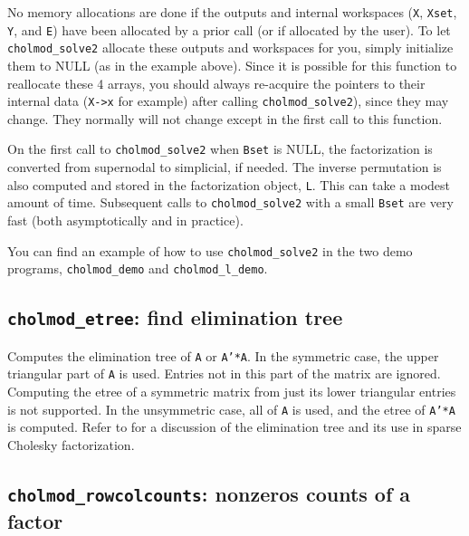 \documentclass[11pt]{article}
\begin{document}
No memory allocations are done if the outputs and internal
workspaces ({\tt X}, {\tt Xset}, {\tt Y}, and {\tt E}) have been allocated
by a prior call (or if allocated by the user).  To let {\tt cholmod\_solve2}
allocate these outputs and workspaces for you, simply initialize them to
NULL (as in the example above).  Since it is possible for this function
to reallocate these 4 arrays, you should always re-acquire the pointers to
their internal data ({\tt X->x} for example) after calling
{\tt cholmod\_solve2}), since they may change.  They normally will not
change except in the first call to this function.

On the first call to {\tt cholmod\_solve2} when {\tt Bset} is NULL,
the factorization is converted from supernodal to simplicial, if needed.
The inverse permutation is also computed and stored in the factorization
object, {\tt L}.  This can take a modest amount of time.  Subsequent
calls to {\tt cholmod\_solve2} with a small {\tt Bset}
are very fast (both asymptotically and in practice).

You can find an example of how to use {\tt cholmod\_solve2} in the
two demo programs, {\tt cholmod\_demo} and {\tt cholmod\_l\_demo}.

\subsection{{\tt cholmod\_etree}: find elimination tree}


Computes the elimination tree of {\tt A} or {\tt A'*A}.
In the symmetric case, the upper triangular part of {\tt A} is used.  Entries not
in this part of the matrix are ignored.  Computing the etree of a symmetric
matrix from just its lower triangular entries is not supported.
In the unsymmetric case, all of {\tt A} is used, and the etree of {\tt A'*A} is computed.
Refer to \cite{Liu90a} for a discussion of the elimination tree
and its use in sparse Cholesky factorization.

\subsection{{\tt cholmod\_rowcolcounts}: nonzeros counts of a factor}
\end{document}
